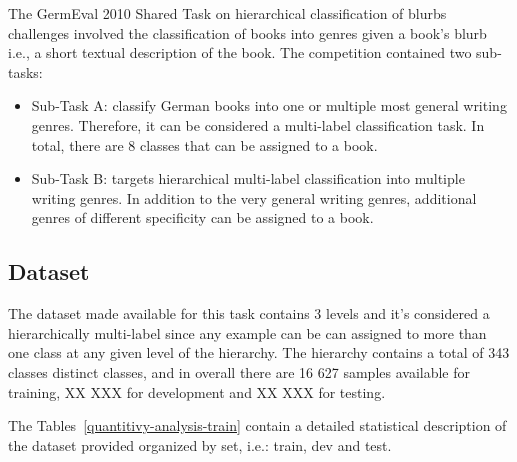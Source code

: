 \documentclass[11pt,a4paper]{article}
\begin{document}
The GermEval 2010 Shared Task on hierarchical classification of blurbs challenges
involved the classification of books into genres given a book's blurb i.e., a
short textual description of the book. The competition contained two sub-tasks:

\begin{itemize}

\item Sub-Task A: classify German books into one or multiple most general writing
genres. Therefore, it can be considered a multi-label classification task. In
total, there are 8 classes that can be assigned to a book.

\item Sub-Task B: targets hierarchical multi-label classification into multiple
writing genres. In addition to the very general writing genres, additional
genres of different specificity can be assigned to a book.

\end{itemize}


\subsection{Dataset}

The dataset made available for this task contains 3 levels and it's considered
a hierarchically multi-label since any example can be can assigned to more than
one class at any given level of the hierarchy. The hierarchy contains a total of
343 classes distinct classes, and in overall there are 16 627 samples available
for training, XX XXX for development and XX XXX for testing.

The Tables~\ref{quantitivy-analysis-train} contain a detailed statistical description of
the dataset provided organized by set, i.e.: train, dev and test.

\end{document}
